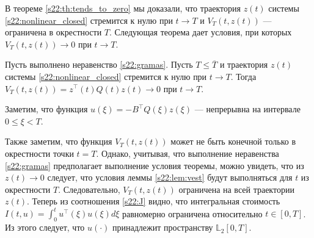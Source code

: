 \documentclass[../main.tex]{subfiles}
\begin{document}
В теореме \ref{s22:th:tends_to_zero} мы доказали, что траектория $z(t)$ системы \eqref{s22:nonlinear_closed} стремится к нулю при $t\to T$ и $V_{T}(t,z(t))$ --- ограничена в окрестности $T$. 
Следующая теорема дает условия, при которых $V_{T}(t,z(t))\to 0$ при $t\to T$.
\begin{theorem}
 Пусть выполнено неравенство \eqref{s22:gramas}. 
Пусть $T \leqslant \overline{T}$ и траектория $z(t)$ системы \eqref{s22:nonlinear_closed} стремится к нулю при $t\to T$. 
Тогда $V_{T}(t,z(t)) =z^{\top}(t)Q(t)z(t) \to 0$ при $t \to T$.
\end{theorem}
\doc 
Заметим, что функция $ u(\xi) = -B^{\top} Q(\xi) z(\xi)$ --- непрерывна на интервале $0 \leqslant \xi <T$. 

Также заметим, что функция $V_{T}(t,z(t))$ может не быть конечной только в окрестности точки $t = T$. 
Однако, учитывая, что выполнение неравенства \eqref{s22:gramas} предполагает выполнение условия теоремы, можно увидеть, что из $z(t)\to 0 $ следует, что условия леммы \ref{s22:lem:vest} будут выполняться для $t$ из окрестности $T$.
Следовательно, $V_{T}(t,z(t))$ ограничена на всей траектории $z(t)$. 
Теперь из соотношения \eqref{s22:J} видно, что интегральная стоимость $I(t,u) = \int_{0}^{t} u^{\top}(\xi)u(\xi) d\xi$ равномерно ограничена относительно $t \in [0,T]$. 
Из этого следует, что $u(\cdot)$ принадлежит пространству $\mathbb L_2[0,T]$. 
 
\end{document}
